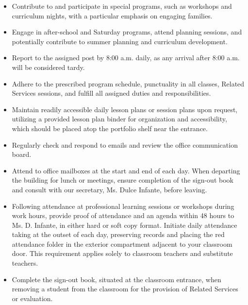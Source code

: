 \documentclass[11pt]{article}
\begin{document}
\begin{itemize}
\item Contribute to and participate in special programs, such as workshops and curriculum nights, with a particular emphasis on engaging families.

\item Engage in after-school and Saturday programs, attend planning sessions, and potentially contribute to summer planning and curriculum development.

\item Report to the assigned post by 8:00 a.m. daily, as any arrival after 8:00 a.m. will be considered tardy.

\item Adhere to the prescribed program schedule, punctuality in all classes, Related Services sessions, and fulfill all assigned duties and responsibilities.

\item Maintain readily accessible daily lesson plans or session plans upon request, utilizing a provided lesson plan binder for organization and accessibility, which should be placed atop the portfolio shelf near the entrance.

\item Regularly check and respond to emails and review the office communication board.

\item Attend to office mailboxes at the start and end of each day. When departing the building for lunch or meetings, ensure completion of the sign-out book and consult with our secretary, Ms. Dulce Infante, before leaving.

\item Following attendance at professional learning sessions or workshops during work hours, provide proof of attendance and an agenda within 48 hours to Ms. D. Infante, in either hard or soft copy format. Initiate daily attendance taking at the outset of each day, preserving records and placing the red attendance folder in the exterior compartment adjacent to your classroom door. This requirement applies solely to classroom teachers and substitute teachers.

\item Complete the sign-out book, situated at the classroom entrance, when removing a student from the classroom for the provision of Related Services or evaluation.


\end{itemize}
\end{document}
